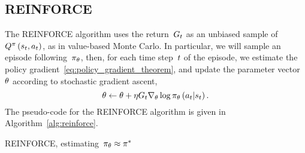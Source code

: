 \subsection{REINFORCE}
The REINFORCE algorithm uses the return~${G_{t}}$ as an unbiased sample of~${Q^{\pi}\left(s_{t},a_{t}\right)}$, as in value-based Monte Carlo. In particular, we will sample an episode following~${\pi_{\theta}}$, then, for each time step~${t}$ of the episode, we estimate the policy gradient~\eqref{eq:policy_gradient_theorem}, and update the parameter vector~${\theta}$ according to stochastic gradient ascent,
\begin{equation} \label{eq:reinforce_update}
	\theta\gets\theta+\eta G_{t}\nabla_{\theta}\log\pi_{\theta}\left(a_{t}\middle\vert s_{t}\right).
\end{equation}
The pseudo-code for the REINFORCE algorithm is given in Algorithm~\ref{alg:reinforce}.
\begin{algorithm}
	\caption{REINFORCE, estimating~${\pi_{\theta}\approx\pi^{*}}$}
	\label{alg:reinforce}

\end{algorithm}

